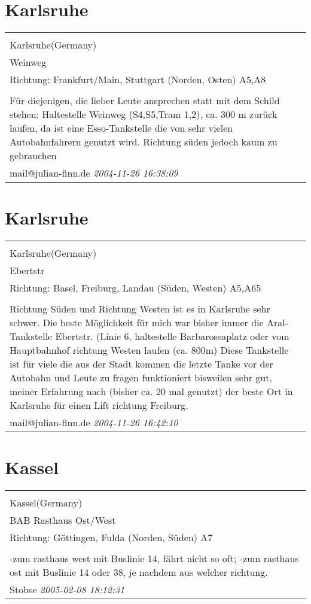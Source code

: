 \documentclass[a4paper,12pt]{article}
\begin{document}
\section{Karlsruhe}
\begin{tabular}{|p{13cm}|}
\hline\\
Karlsruhe(Germany)\\
Weinweg\\
Richtung: Frankfurt/Main, Stuttgart (Norden, Osten) A5,A8 \\
\hline\\
Für diejenigen, die lieber Leute ansprechen statt mit dem Schild stehen:
Haltestelle Weinweg (S4,S5,Tram 1,2), ca. 300 m zurück laufen, da ist eine Esso-Tankstelle die von sehr vielen Autobahnfahrern genutzt wird.
Richtung süden jedoch kaum zu gebrauchen \\
mail@julian-finn.de \textit{ 2004-11-26 16:38:09 }\\\hline
\end{tabular}


\section{Karlsruhe}
\begin{tabular}{|p{13cm}|}
\hline\\
Karlsruhe(Germany)\\
Ebertstr\\
Richtung: Basel, Freiburg, Landau (Süden, Westen) A5,A65 \\
\hline\\
Richtung Süden und Richtung Westen ist es in Karlsruhe sehr schwer. Die beste Möglichkeit für mich war bisher immer die Aral-Tankstelle Ebertstr. (Linie 6, haltestelle Barbarossaplatz oder vom Hauptbahnhof richtung Westen laufen (ca. 800m)
Diese Tankstelle ist für viele die aus der Stadt kommen die letzte Tanke vor der Autobahn und Leute zu fragen funktioniert bisweilen sehr gut, meiner Erfahrung nach (bisher ca. 20 mal genutzt) der beste Ort in Karlsruhe für einen Lift richtung Freiburg. \\
mail@julian-finn.de \textit{ 2004-11-26 16:42:10 }\\\hline
\end{tabular}


\section{Kassel}
\begin{tabular}{|p{13cm}|}
\hline\\
Kassel(Germany)\\
BAB Rasthaus Ost/West\\
Richtung: Göttingen, Fulda (Norden, Süden) A7 \\
\hline\\
-zum rasthaus west mit Buslinie 14, fährt nicht so oft;
-zum rasthaus ost mit Buslinie 14 oder 38, je nachdem aus welcher richtung. \\
Stobse \textit{ 2005-02-08 18:12:31 }\\\hline
\end{tabular}
\end{document}
